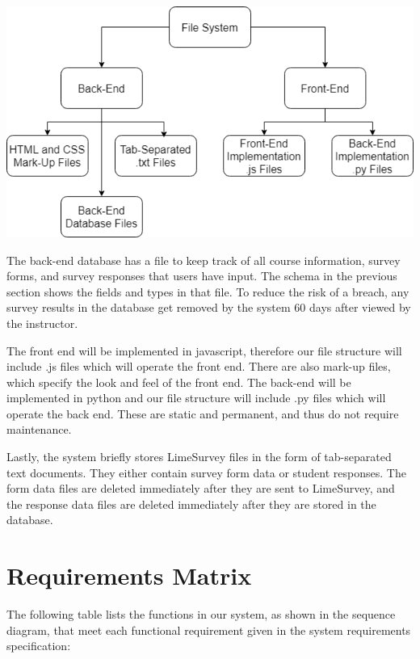 \documentclass{article}
\begin{document}
\newpage
\begin{center}
\label{fig:filediagram}
{\includegraphics[scale=.64]{images/file_structure_diagram.png}} 
\end{center}

\vspace{3mm}

The back-end database has a file to keep track of all course information, survey forms, and survey responses that users have input. The schema in the previous section shows the fields and types in that file. To reduce the risk of a breach, any survey results in the database get removed by the system 60 days after viewed by the instructor. 

The front end will be implemented in javascript, therefore our file structure will include .js files which will operate the front end.  There are also mark-up files, which specify the look and feel of the front end. The back-end will be implemented in python and our file structure will include .py files which will operate the back end. These are static and permanent, and thus do not require maintenance.

Lastly, the system briefly stores LimeSurvey files in the form of tab-separated text documents. They either contain survey form data or student responses. The form data files are deleted immediately after they are sent to LimeSurvey, and the response data files are deleted immediately after they are stored in the database.

\section{Requirements Matrix}

The following table lists the functions in our system, as shown in the sequence diagram, that meet each functional requirement given in the system requirements specification:
\end{document}
